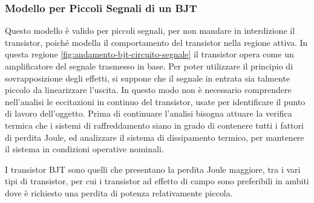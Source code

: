 \documentclass{article}
\numberwithin{equation}{subsection}
\begin{document}
\subsubsection{Modello per Piccoli Segnali di un BJT}

Questo modello è valido per piccoli segnali, per non mandare in interdizione il transistor, poiché modella il comportamento del transistor nella regione 
attiva. In questa regione \ref{fig:andamento-bjt-circuito-segnale} il transistor opera come un amplificatore del segnale trasmesso in base. 
Per poter utilizzare il principio di sovrapposizione degli effetti, si suppone che il segnale in entrata sia talmente piccolo da linearizzare l'uscita. 
In questo modo non è necessario comprendere nell'analisi le eccitazioni in continuo del transistor, usate per identificare il punto di lavoro dell'oggetto. 
Prima di continuare l'analisi bisogna attuare la verifica termica che i sistemi di raffreddamento siano in grado di contenere tutti i fattori di perdita Joule, ed 
analizzare il sistema di dissipamento termico, per mantenere il sistema in condizioni operative nominali.  

I transistor BJT sono quelli che presentano la perdita Joule maggiore, tra i vari tipi di transistor, per cui i transistor ad effetto di campo sono preferibili in 
ambiti dove è richiesto una perdita di potenza relativamente piccola. 
\end{document}
